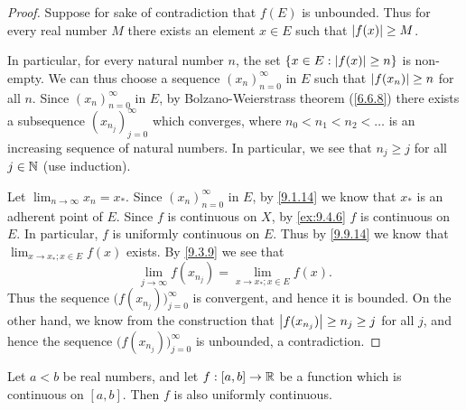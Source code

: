 \begin{proof}
  Suppose for sake of contradiction that \(f(E)\) is unbounded.
  Thus for every real number \(M\) there exists an element \(x \in E\) such that \(\left\lvert f(x)\right\rvert \geq M\).

  In particular, for every natural number \(n\), the set \(\{x \in E : \left\lvert f(x)\right\rvert \geq n\}\) is non-empty.
  We can thus choose a sequence \((x_n)_{n = 0}^\infty\) in \(E\) such that \(\left\lvert f(x_n)\right\rvert \geq n\) for all \(n\).
  Since \((x_n)_{n = 0}^\infty\) in \(E\), by Bolzano-Weierstrass theorem (\cref{6.6.8}) there exists a subsequence \((x_{n_j})_{j = 0}^\infty\) which converges, where \(n_0 < n_1 < n_2 < \dots\) is an increasing sequence of natural numbers.
  In particular, we see that \(n_j \geq j\) for all \(j \in \mathbb{N}\) (use induction).

  Let \(\lim_{n \to \infty} x_n = x_*\).
  Since \((x_n)_{n = 0}^\infty\) in \(E\), by \cref{9.1.14} we know that \(x_*\) is an adherent point of \(E\).
  Since \(f\) is continuous on \(X\), by \cref{ex:9.4.6} \(f\) is continuous on \(E\).
  In particular, \(f\) is uniformly continuous on \(E\).
  Thus by \cref{9.9.14} we know that \(\lim_{x \to x_* ; x \in E} f(x)\) exists.
  By \cref{9.3.9} we see that
  \[
    \lim_{j \to \infty} f(x_{n_j}) = \lim_{x \to x_* ; x \in E} f(x).
  \]
  Thus the sequence \(\big(f(x_{n_j})\big)_{j = 0}^\infty\) is convergent, and hence it is bounded.
  On the other hand, we know from the construction that \(\left\lvert f(x_{n_j})\right\rvert \geq n_j \geq j\) for all \(j\), and hence the sequence \(\big(f(x_{n_j})\big)_{j = 0}^\infty\) is unbounded, a contradiction.
\end{proof}

\begin{thm}\label{9.9.16}
  Let \(a < b\) be real numbers, and let \(f : [a, b] \to \mathbb{R}\) be a function which is continuous on \([a, b]\).
  Then \(f\) is also uniformly continuous.
\end{thm}

